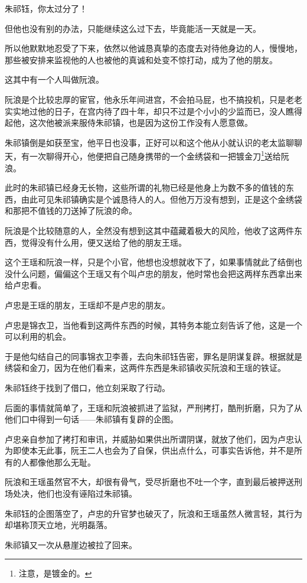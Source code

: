 \begin{multicols}{\theparacolNo}
朱祁钰，你太过分了！

但他也没有别的办法，只能继续这么过下去，毕竟能活一天就是一天。

所以他默默地忍受了下来，依然以他诚恳真挚的态度去对待他身边的人，慢慢地，那些被安排来监视他的人也被他的真诚和处变不惊打动，成为了他的朋友。

这其中有一个人叫做阮浪。

阮浪是个比较忠厚的宦官，他永乐年间进宫，不会拍马屁，也不搞投机，只是老老实实地过他的日子，在宫内待了四十年，却只不过是个小小的少监而已，没人瞧得起他，这次他被派来服侍朱祁镇，也是因为这份工作没有人愿意做。

朱祁镇倒是如获至宝，他平日也没事，正好可以和这个他从小就认识的老太监聊聊天，有一次聊得开心，他便把自己随身携带的一个金绣袋和一把镀金刀\footnote{注意，是镀金的。}送给阮浪。

此时的朱祁镇已经身无长物，这些所谓的礼物已经是他身上为数不多的值钱的东西，由此可见朱祁镇确实是个诚恳待人的人。但他万万没有想到，正是这个金绣袋和那把不值钱的刀送掉了阮浪的命。

阮浪是个比较随意的人，全然没有想到这其中蕴藏着极大的风险，他收了这两件东西，觉得没有什么用，便又送给了他的朋友王瑶。

这个王瑶和阮浪一样，只是个小官，他想也没想就收下了，如果事情就此了结倒也没什么问题，偏偏这个王瑶又有个叫卢忠的朋友，他时常也会把这两样东西拿出来给卢忠看。

卢忠是王瑶的朋友，王瑶却不是卢忠的朋友。

卢忠是锦衣卫，当他看到这两件东西的时候，其特务本能立刻告诉了他，这是一个可以利用的机会。

于是他勾结自己的同事锦衣卫李善，去向朱祁钰告密，罪名是阴谋复辟。根据就是绣袋和金刀，因为在他们看来，这两件东西是朱祁镇收买阮浪和王瑶的铁证。

朱祁钰终于找到了借口，他立刻采取了行动。

后面的事情就简单了，王瑶和阮浪被抓进了监狱，严刑拷打，酷刑折磨，只为了从他们口中得到一句话——朱祁镇有复辟的企图。

卢忠亲自参加了拷打和审讯，并威胁如果供出所谓阴谋，就放了他们，因为卢忠认为即使本无此事，阮王二人也会为了自保，供出点什么，可事实告诉他，并不是所有的人都像他那么无耻。

阮浪和王瑶虽然官不大，却很有骨气，受尽折磨也不吐一个字，直到最后被押送刑场处决，他们也没有诬陷过朱祁镇。

朱祁钰的企图落空了，卢忠的升官梦也破灭了，阮浪和王瑶虽然人微言轻，其行为却堪称顶天立地，光明磊落。

朱祁镇又一次从悬崖边被拉了回来。


\end{multicols}
